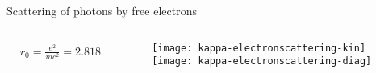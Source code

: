 \begin{frame}{Scattering of photons by free electrons}
\begin{columns}[T]
\begin{column}{0.65\textwidth}
\begin{align*}
                &r_0=\frac{e^2}{mc^2}=\SI{2.818e-13}{\cm}\tag{$r_0$ radius of shell charge e of energy $m_ec^2$}
            \end{align*}
        \end{column}
        \begin{column}{0.35\textwidth}
            \begin{figure}[!ht]
                \texttt{[image: kappa-electronscattering-kin]}\label{fig:kappa-electronscattering-kin}
                \texttt{[image: kappa-electronscattering-diag]}\label{fig:kappa-electronscattering-diag}
			\end{figure}
        \end{column}
    \end{columns}
    
\end{frame}

